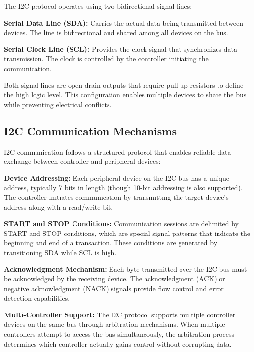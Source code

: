 
The I2C protocol operates using two bidirectional signal lines:

\textbf{Serial Data Line (SDA):} Carries the actual data being transmitted between devices. The line is bidirectional and shared among all devices on the bus.

\textbf{Serial Clock Line (SCL):} Provides the clock signal that synchronizes data transmission. The clock is controlled by the controller initiating the communication.

Both signal lines are open-drain outputs that require pull-up resistors to define the high logic level. This configuration enables multiple devices to share the bus while preventing electrical conflicts.

\subsection{I2C Communication Mechanisms}
\label{subsec:i2c-communication}

I2C communication follows a structured protocol that enables reliable data exchange between controller and peripheral devices:

\textbf{Device Addressing:} Each peripheral device on the I2C bus has a unique address, typically 7 bits in length (though 10-bit addressing is also supported). The controller initiates communication by transmitting the target device's address along with a read/write bit.

\textbf{START and STOP Conditions:} Communication sessions are delimited by START and STOP conditions, which are special signal patterns that indicate the beginning and end of a transaction. These conditions are generated by transitioning SDA while SCL is high.

\textbf{Acknowledgment Mechanism:} Each byte transmitted over the I2C bus must be acknowledged by the receiving device. The acknowledgment (ACK) or negative acknowledgment (NACK) signals provide flow control and error detection capabilities.

\textbf{Multi-Controller Support:} The I2C protocol supports multiple controller devices on the same bus through arbitration mechanisms. When multiple controllers attempt to access the bus simultaneously, the arbitration process determines which controller actually gains control without corrupting data.

